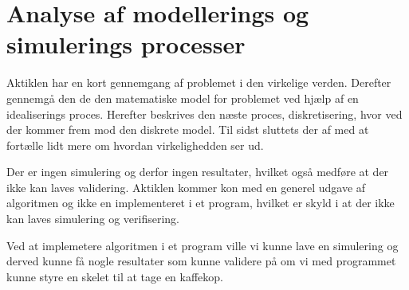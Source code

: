 \section{Analyse af modellerings og simulerings processer}
Aktiklen har en kort gennemgang af problemet i den virkelige verden. Derefter 
gennemgå den de den matematiske model for problemet ved hjælp af en 
idealiserings proces. Herefter beskrives den næste proces, diskretisering, hvor 
ved der kommer frem mod den diskrete model. Til sidst sluttets der af med at 
fortælle lidt mere om hvordan virkelighedden ser ud.

Der er ingen simulering og derfor ingen resultater, hvilket også medføre at der 
ikke kan laves validering. Aktiklen kommer kon med en generel udgave af 
algoritmen og ikke en implementeret i et program, hvilket er skyld i at der 
ikke kan laves simulering og verifisering.


Ved at implemetere algoritmen i et program ville vi kunne lave en simulering og derved kunne få nogle resultater som kunne validere på om vi med programmet kunne styre en skelet til at tage en kaffekop.
